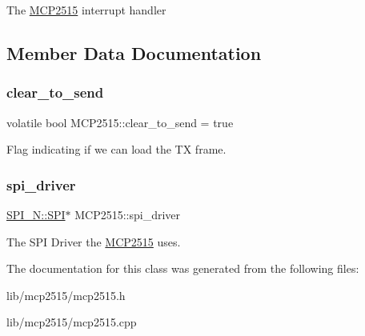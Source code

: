 The \hyperlink{class_m_c_p2515}{M\+C\+P2515} interrupt handler 

\subsection{Member Data Documentation}
\hypertarget{class_m_c_p2515_a1418f0f66d9a57659809192552d5ac37}{}\label{class_m_c_p2515_a1418f0f66d9a57659809192552d5ac37} 
\subsubsection{\texorpdfstring{clear\+\_\+to\+\_\+send}{clear\_to\_send}}
{\footnotesize\ttfamily volatile bool M\+C\+P2515\+::clear\+\_\+to\+\_\+send = true\hspace{0.3cm}{\ttfamily [private]}}

Flag indicating if we can load the TX frame. \hypertarget{class_m_c_p2515_a3a5ca0d606115f1551a06d871606540e}{}\label{class_m_c_p2515_a3a5ca0d606115f1551a06d871606540e} 
\subsubsection{\texorpdfstring{spi\+\_\+driver}{spi\_driver}}
{\footnotesize\ttfamily \hyperlink{class_s_p_i___n_1_1_s_p_i}{S\+P\+I\+\_\+\+N\+::\+S\+PI}$\ast$ M\+C\+P2515\+::spi\+\_\+driver\hspace{0.3cm}{\ttfamily [private]}}

The S\+PI Driver the \hyperlink{class_m_c_p2515}{M\+C\+P2515} uses. 

The documentation for this class was generated from the following files\+:\begin{DoxyCompactItemize}
\item 
lib/mcp2515/mcp2515.\+h\item 
lib/mcp2515/mcp2515.\+cpp\end{DoxyCompactItemize}
